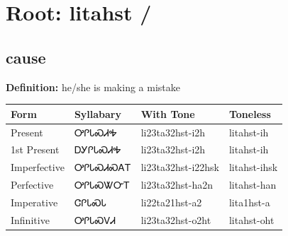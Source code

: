 \documentclass{article}%
\begin{document}
%
\normalsize%
\section*{Root: litahst / }%
\subsection*{cause}%
\textbf{Definition: }%
he/she is making a mistake%
\\[0.5em]%
\begin{tabular}{|l|l|l|l|}%
\hline%
\textbf{Form}&\textbf{Syllabary}&\textbf{With Tone}&\textbf{Toneless}\\%
\hline%
Present&ᎤᎵᏓᏍᏗᎭ&li23ta32hst{-}i2h&litahst{-}ih\\%
1st Present&ᎠᎩᎵᏓᏍᏗᎭ&li23ta32hst{-}i2h&litahst{-}ih\\%
Imperfective&ᎤᎵᏓᏍᏗᏍᎪᎢ&li23ta32hst{-}i22hsk&litahst{-}ihsk\\%
Perfective&ᎤᎵᏓᏍᏔᏅᎢ&li23ta32hst{-}ha2n&litahst{-}han\\%
Imperative&ᏣᎵᏓᏍᏓ&li22ta21hst{-}a2&lita1hst{-}a\\%
Infinitive&ᎤᎵᏓᏍᏙᏗ&li23ta32hst{-}o2ht&litahst{-}oht\\%
\hline%
\end{tabular}%
\\[1em]%
\end{document}
